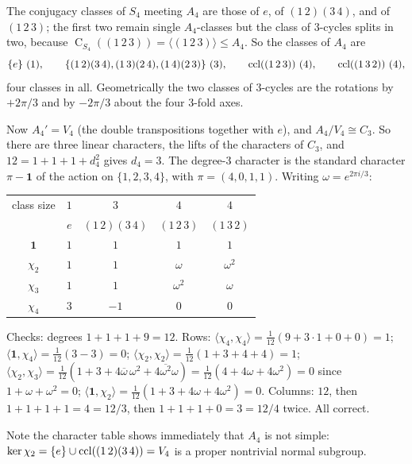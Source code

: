 \documentclass[a4paper]{scrartcl}
\newcommand{\Cent}{\operatorname{C}}
\newcommand{\ip}[2]{\langle #1, #2 \rangle}
\newcommand{\gen}[1]{\langle #1 \rangle}
\begin{document}
The conjugacy classes of $S_4$ meeting $A_4$ are those of $e$, of $(1\,2)(3\,4)$, and of $(1\,2\,3)$; the first two remain single $A_4$-classes but the class of $3$-cycles splits in two, because $\Cent_{S_4}((1\,2\,3)) = \gen{(1\,2\,3)} \leq A_4$. So the classes of $A_4$ are
$$\{e\}\ (1),\qquad \{(1\,2)(3\,4),(1\,3)(2\,4),(1\,4)(2\,3)\}\ (3),\qquad \ccl((1\,2\,3))\ (4),\qquad \ccl((1\,3\,2))\ (4),$$
four classes in all. Geometrically the two classes of $3$-cycles are the rotations by $+2\pi/3$ and by $-2\pi/3$ about the four $3$-fold axes.

Now $A_4' = V_4$ (the double transpositions together with $e$), and $A_4/V_4\cong C_3$. So there are three linear characters, the lifts of the characters of $C_3$, and $12 = 1+1+1+d_4^2$ gives $d_4 = 3$. The degree-$3$ character is the standard character $\pi - \mathbf 1$ of the action on $\{1,2,3,4\}$, with $\pi = (4,0,1,1)$. Writing $\omega = e^{2\pi i/3}$:

\begin{center}
\renewcommand{\arraystretch}{1.3}
\setlength{\tabcolsep}{12pt}
\begin{tabular}{c|cccc}
\toprule
class size & $1$ & $3$ & $4$ & $4$\\
 & $e$ & $(1\,2)(3\,4)$ & $(1\,2\,3)$ & $(1\,3\,2)$\\
\midrule
$\mathbf 1$ & $1$ & $1$ & $1$ & $1$\\
$\chi_2$ & $1$ & $1$ & $\omega$ & $\omega^2$\\
$\chi_3$ & $1$ & $1$ & $\omega^2$ & $\omega$\\
$\chi_4$ & $3$ & $-1$ & $0$ & $0$\\
\bottomrule
\end{tabular}
\end{center}

Checks: degrees $1+1+1+9 = 12$. Rows: $\ip{\chi_4}{\chi_4} = \frac1{12}(9 + 3\cdot1 + 0 + 0) = 1$; $\ip{\mathbf1}{\chi_4} = \frac1{12}(3 - 3) = 0$; $\ip{\chi_2}{\chi_2} = \frac1{12}(1 + 3 + 4 + 4) = 1$; $\ip{\chi_2}{\chi_3} = \frac1{12}(1 + 3 + 4\overline\omega\,\omega^2 + 4\overline{\omega^2}\omega) = \frac1{12}(4 + 4\omega + 4\omega^2) = 0$ since $1 + \omega+\omega^2 = 0$; $\ip{\mathbf 1}{\chi_2} = \frac1{12}(1+3+4\omega+4\omega^2) = 0$. Columns: $12$, then $1+1+1+1 = 4 = 12/3$, then $1+1+1+0 = 3 = 12/4$ twice. All correct.

Note the character table shows immediately that $A_4$ is not simple: $\operatorname{ker}\chi_2 = \{e\}\cup\operatorname{ccl}((1\,2)(3\,4)) = V_4$ is a proper nontrivial normal subgroup.
\end{document}
